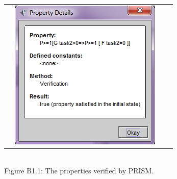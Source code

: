 \documentclass[12pt]{report}
\begin{document}
\begin{figure}[H]
\begin{tabular}{ l c c r }
				& \includegraphics[scale=0.5]{../GFX/A2-1RR2.png}
			\end{tabular}\\
			Figure B1.1: The properties verified by PRISM.
		\end{figure}
\end{document}
